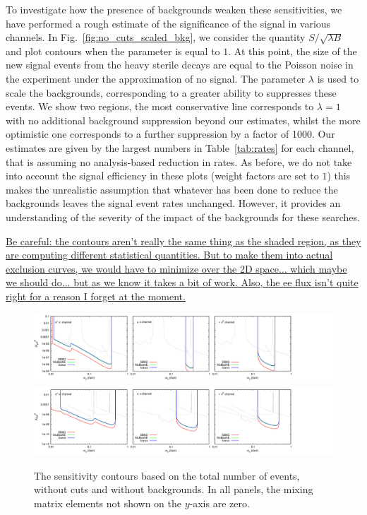 \documentclass[11pt, a4paper]{article}
\newcommand{\reffig}[1]{Fig.~\ref{#1}}
\newcommand{\reftab}[1]{Table~\ref{#1}}
\newcommand{\newtext}[2]{\textcolor{#1}{\ul{#2}}}
\begin{document}
To investigate how the presence of backgrounds weaken these sensitivities, we
have performed a rough estimate of the significance of the signal in various
channels. In \reffig{fig:no_cuts_scaled_bkg}, we consider the quantity
$S/\sqrt{\lambda B}$ and plot contours when the parameter is equal to $1$. At
this point, the size of the new signal events from the heavy sterile decays are
equal to the Poisson noise in the experiment under the approximation of no
signal. The parameter $\lambda$ is used to scale the backgrounds, corresponding
to a greater ability to suppresses these events.  We show two regions, the most
conservative line corresponds to $\lambda=1$ with no additional background
suppression beyond our estimates, whilst the more optimistic one corresponds to
a further suppression by a factor of 1000. Our estimates are given by the
largest numbers in \reftab{tab:rates} for each channel, that is assuming no
analysis-based reduction in rates. As before, we do not take into account the
signal efficiency in these plots (weight factors are set to $1$) this makes the
unrealistic assumption that whatever has been done to reduce the backgrounds
leaves the signal event rates unchanged. However, it provides an understanding of 
the severity of the impact of the backgrounds for these searches.

\newtext{PB}{Be careful: the contours aren't really the same thing as the
shaded region, as they are computing different statistical quantities. But to
make them into actual exclusion curves, we would have to minimize over the 2D
space... which maybe we should do... but as we know it takes a bit of work.
Also, the ee flux isn't quite right for a reason I forget at the moment.}


\begin{figure}[t]
\center
\includegraphics[width=1.0\textwidth,clip,trim=0 20 300 15]{figures/zerobg_um4_all_panels.pdf}
\includegraphics[width=1.0\textwidth,clip,trim=0 20 300 15]{figures/zerobg_ue4_all_panels.pdf}

\caption{\label{fig:no_cuts_no_bkg}The sensitivity contours based on the total number of events, without cuts and without backgrounds. In all panels, the mixing matrix elements not shown on the $y$-axis are zero.}

\end{figure}
\end{document}
